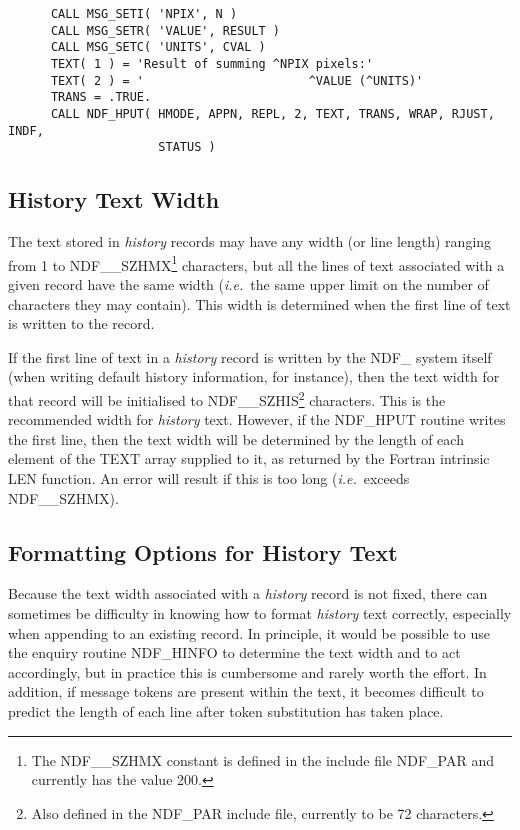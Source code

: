 \documentclass[twoside,11pt]{article}
\newcommand{\htmlref}[2]{#1}
\newcommand{\xlabel}[1]{}
\newcommand{\st}[1]{{\em{#1}}}
\begin{document}
\small
\begin{verbatim}
      CALL MSG_SETI( 'NPIX', N )
      CALL MSG_SETR( 'VALUE', RESULT )
      CALL MSG_SETC( 'UNITS', CVAL )
      TEXT( 1 ) = 'Result of summing ^NPIX pixels:'
      TEXT( 2 ) = '                       ^VALUE (^UNITS)'
      TRANS = .TRUE.
      CALL NDF_HPUT( HMODE, APPN, REPL, 2, TEXT, TRANS, WRAP, RJUST, INDF,
                     STATUS )
\end{verbatim}
\normalsize

\subsection{\xlabel{history_text_width}History Text Width}

The text stored in \st{history\/} records may have any width (or line length)
ranging from 1 to NDF\_\_SZHMX\footnote{The NDF\_\_SZHMX constant is
defined in the include file NDF\_PAR and currently has the value 200.}
characters, but all the lines of text associated with a given record
have the same width (\st{i.e.}\ the same upper limit on the number of
characters they may contain). This width is determined when the first
line of text is written to the record.

If the first line of text in a \st{history\/} record is written by the NDF\_
system itself (when writing default history information, for
instance), then the text width for that record will be initialised to
NDF\_\_SZHIS\footnote{Also defined in the NDF\_PAR include file,
currently to be 72 characters.} characters. This is the recommended
width for \st{history\/} text. However, if the \htmlref{NDF\_HPUT}{NDF_HPUT} routine writes the
first line, then the text width will be determined by the length of
each element of the TEXT array supplied to it, as returned by the
Fortran intrinsic LEN function. An error will result if this is too
long (\st{i.e.}\ exceeds NDF\_\_SZHMX).

\subsection{\xlabel{formatting_options_for_history_text}Formatting Options for History Text}

Because the text width associated with a \st{history\/} record is not fixed,
there can sometimes be difficulty in knowing how to format \st{history\/}
text correctly, especially when appending to an existing record.  In
principle, it would be possible to use the enquiry routine \htmlref{NDF\_HINFO}{NDF_HINFO}
to determine the text width and to act accordingly, but in practice
this is cumbersome and rarely worth the effort. In addition, if
message tokens are present within the text, it becomes difficult to
predict the length of each line after token substitution has taken
place.
\end{document}

